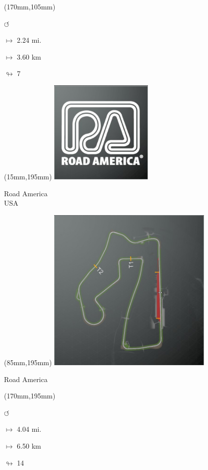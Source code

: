 \begin{textblock*}{30mm}(170mm,105mm)%
\par \Huge$\circlearrowleft$
\Large
\par$\mapsto$ 2.24 mi.
\par$\mapsto$ 3.60 km
\par$\looparrowright$ 7
\end{textblock*}
\begin{textblock*}{60mm}(15mm,195mm)%
\includegraphics[width=50mm]{LG/2015-05-20_00092.png}
\par Road America\\ USA
\end{textblock*}
\begin{textblock*}{80mm}(85mm,195mm)%
\includegraphics[width=80mm]{TR/2015-05-20_00051.png}
\centerline{Road America}
\end{textblock*}
\begin{textblock*}{30mm}(170mm,195mm)%
\par \Huge$\circlearrowleft$
\Large
\par$\mapsto$ 4.04 mi.
\par$\mapsto$ 6.50 km
\par$\looparrowright$ 14
\end{textblock*}
\null\newpage

